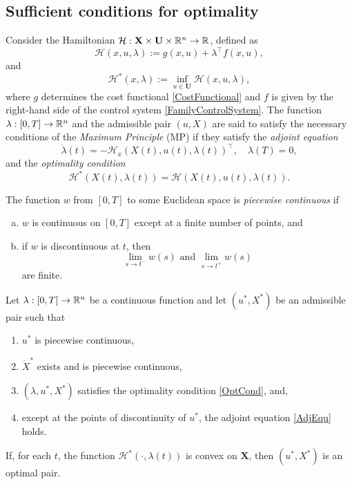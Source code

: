 \begin{theorem}
\subsection{Sufficient conditions for optimality}
    Consider the Hamiltonian $\mathcal{H}:\mathbf{X}\times\mathbf{U}\times\mathbb{R}^n\to \mathbb{R}$, defined as 
    \[
        \mathcal{H}(x,u,\lambda):= g(x,u) + \lambda^\top f(x,u),
    \]
    and
    \[ 
        \mathcal{H}^\ast(x,\lambda)  
        := \inf_{u\in\mathbf{U}}\mathcal{H}(x,u,\lambda),
    \]
    where $g$ determines the cost functional 
    \eqref{CostFunctional} and $f$ is given by the right-hand side of the control system 
    \eqref{FamilyControlSystem}.
    The function $\lambda:[0,T]\to \mathbb{R}^n$ and the admissible pair 
    $(u,X)$ are said to satisfy the necessary conditions of the 
    {\it Maximum Principle} (MP) if they satisfy the
    {\it adjoint equation}
    \begin{equation}\label{AdjEqu}
         \dot{\lambda}(t) = -\mathcal{H}_x(X(t),u(t),\lambda(t))^\top, \quad \lambda(T)=0,
    \end{equation}
    and the {\it optimality condition}
    \begin{equation}\label{OptCond}
       \mathcal{H}^\ast(X(t),\lambda(t)) =
        \mathcal{H}(X(t),u(t),\lambda(t)).
   \end{equation}
%
    \begin{definition}\label{PiecewiseCont}
        \rm The function $w$ from $[0,T]$ to some Euclidean space is {\it piecewise continuous} if
        \begin{enumerate}[(a)]
            \item $w$ is continuous on $[0,T]$ except at a finite number of points, and 
            \item if $w$ is discontinuous at $t$, then  
                \[\lim_{s\to t^-}w(s) \mbox{ and } \lim_{s\to t^+}w(s)\]
                are finite. 
    \end{enumerate}
\end{definition}

\begin{theorem} Let $\lambda:[0,T]\to \mathbb{R}^n$  be a continuous function 
    and let $(u^\ast,X^\ast)$ be an admissible pair such that 
    \begin{enumerate}[\rm (a)]
        \item $u^\ast$ is piecewise continuous,
        \item $\dot{X}^\ast$ exists and is piecewise continuous,
        \item $(\lambda,u^\ast,X^\ast)$ satisfies the optimality condition \eqref{OptCond}, and,
        \item except at the points of discontinuity of $u^\ast$, the adjoint equation \eqref{AdjEqu} holds.
    \end{enumerate}
If, for each $t$, the function $\mathcal{H}^\ast(\cdot,\lambda(t))$ is convex on $\mathbf{X}$, then $(u^\ast,X^\ast)$ is an optimal pair.
\end{theorem}


\end{theorem}
